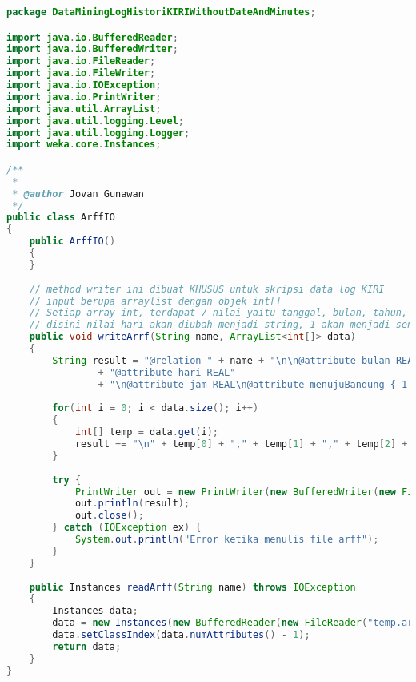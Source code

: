 \begin{lstlisting}[language=Java,basicstyle=\tiny,caption=ArffIO.java]
package DataMiningLogHistoriKIRIWithoutDateAndMinutes;

import java.io.BufferedReader;
import java.io.BufferedWriter;
import java.io.FileReader;
import java.io.FileWriter;
import java.io.IOException;
import java.io.PrintWriter;
import java.util.ArrayList;
import java.util.logging.Level;
import java.util.logging.Logger;
import weka.core.Instances;

/**
 *
 * @author Jovan Gunawan
 */
public class ArffIO 
{
    public ArffIO()
    {
    }
    
    // method writer ini dibuat KHUSUS untuk skripsi data log KIRI
    // input berupa arraylist dengan objek int[]
    // Setiap array int, terdapat 7 nilai yaitu tanggal, bulan, tahun, hari, jam, menit, menujuBandung
    // disini nilai hari akan diubah menjadi string, 1 akan menjadi senin, ..., dan 7 akan menjadi minggu
    public void writeArrf(String name, ArrayList<int[]> data)
    {
        String result = "@relation " + name + "\n\n@attribute bulan REAL\n@attribute tahun REAL\n"
                + "@attribute hari REAL"
                + "\n@attribute jam REAL\n@attribute menujuBandung {-1,0,1}\n\n@data";
        
        for(int i = 0; i < data.size(); i++)
        {
            int[] temp = data.get(i);
            result += "\n" + temp[0] + "," + temp[1] + "," + temp[2] + "," + temp[3] + "," + temp[4]; 
        }
        
        try {
            PrintWriter out = new PrintWriter(new BufferedWriter(new FileWriter("temp.arff")));
            out.println(result);
            out.close();
        } catch (IOException ex) {
            System.out.println("Error ketika menulis file arff");
        }
    }
    
    public Instances readArff(String name) throws IOException
    {
        Instances data;
        data = new Instances(new BufferedReader(new FileReader("temp.arff")));
        data.setClassIndex(data.numAttributes() - 1);
        return data;
    }
}
\end{lstlisting}

